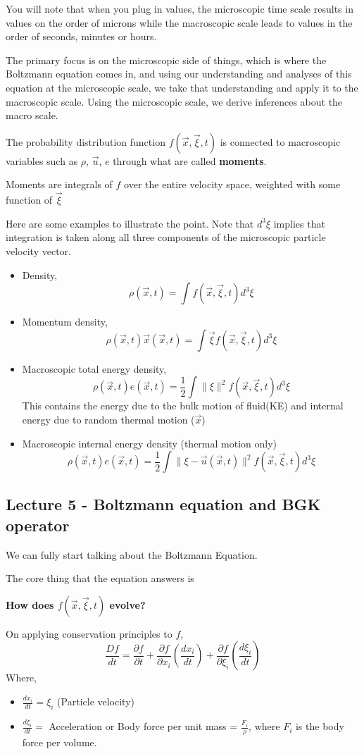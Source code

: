 \documentclass{article}
\begin{document}
You will note that when you plug in values, the microscopic time scale results in values on the order of microns while the macroscopic scale leads to values in the order of seconds, minutes or hours.

The primary focus is on the microscopic side of things, which is where the Boltzmann equation comes in, and using our understanding and analyses of this equation at the microscopic scale, we take that understanding and apply it to the macroscopic scale. Using the microscopic scale, we derive inferences about the macro scale.

The probability distribution function $f(\vec{x}, \vec{\xi}, t)$ is connected to macroscopic variables such as $\rho$, $\vec{u}$, $e$ through what are called \textbf{moments}.

Moments are integrals of $f$ over the entire velocity space, weighted with some function of $\vec{\xi}$

Here are some examples to illustrate the point. Note that $d^3 \xi$ implies that integration is taken along all three components of the microscopic particle velocity vector.

\begin{itemize}
	\item Density, $$\rho(\vec{x},t) = \int f(\vec{x}, \vec{\xi}, t) d^3 \xi$$
	\item Momentum density,
		$$\rho(\vec{x},t) \vec{x}(\vec{x},t) = \int \vec{\xi} f(\vec{x}, \vec{\xi}, t) d^3 \xi$$
	\item Macroscopic total energy density,
		$$\rho(\vec{x},t) e(\vec{x},t) = \frac{1}{2} \int \| \xi \|^2 f(\vec{x},\vec{\xi},t) d^3 \xi$$ This contains the energy due to the  bulk motion of fluid(KE) and internal energy due to random thermal motion ($\vec{x}$)
	\item Macroscopic internal energy density (thermal motion only)
		$$\rho(\vec{x},t) e(\vec{x},t) = \frac{1}{2} \int \| \xi - \vec{u}(\vec{x},t) \|^2 f(\vec{x},\vec{\xi},t) d^3 \xi$$
\end{itemize}
\subsection{Lecture 5 - Boltzmann equation and BGK operator}
We can fully start talking about the Boltzmann Equation.

The core thing that the equation answers is

\textbf{How does $f(\vec{x},\vec{\xi},t)$ evolve?}

On applying conservation principles to $f$,
\[
	\frac{Df}{dt} = \frac{\partial f}{\partial t} + \frac{\partial f}{\partial x_i}(\frac{d x_i}{dt}) + \frac{\partial f}{\partial \xi_i}(\frac{d \xi_i}{dt})
\]
Where, 
\begin{itemize}
	\item $\frac{dx_i}{dt} = \xi_i$ (Particle velocity)
	\item $\frac{d \xi_i}{dt} =$ Acceleration or Body force per unit mass = $\frac{F_i}{\rho}$, where $F_i$ is the body force per volume.
\end{itemize}
\end{document}
